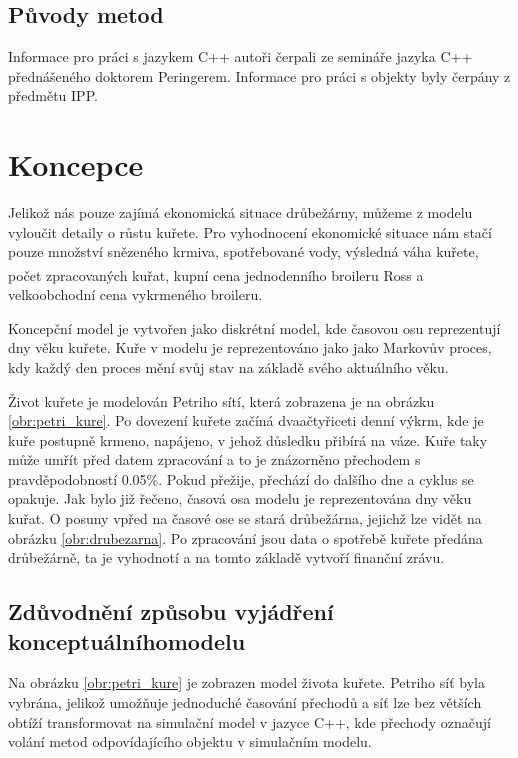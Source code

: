 \documentclass[a4paper,10pt]{article}
\begin{document}
\subsection{Původy metod}\label{puvod}
Informace pro práci s jazykem C++ autoři čerpali ze semináře jazyka C++\cite{cpp}
přednášeného doktorem Peringerem. Informace pro práci s objekty byly čerpány
z předmětu IPP\cite{ipp}.





\section{Koncepce}\label{koncepce}
Jelikož nás pouze zajímá ekonomická situace drůbežárny, můžeme z modelu vyloučit detaily
o růstu kuřete. Pro vyhodnocení ekonomické situace nám stačí pouze množství snězeného krmiva,
spotřebované vody, výsledná váha kuřete, počet zpracovaných kuřat, 
kupní cena jednodenního broileru Ross\textsuperscript\textregistered
a velkoobchodní cena vykrmeného broileru.
\par
Koncepční model\cite{concept_model} je vytvořen jako diskrétní model, kde časovou osu reprezentují dny věku kuřete.
Kuře v modelu je reprezentováno jako jako Markovův proces\cite{markovuv_proces},
kdy každý den proces mění svůj stav na základě svého aktuálního věku.
\par
Život kuřete je modelován Petriho sítí, která zobrazena je na obrázku \ref{obr:petri_kure}.
Po dovezení kuřete začíná dvaačtyřiceti denní výkrm, kde je kuře postupně krmeno, napájeno, v jehož důsledku
přibírá na váze. Kuře taky může umřít před datem zpracování a to je znázorněno přechodem\cite{prechod} s pravděpodobností 0.05\%.
Pokud přežije, přechází do dalšího dne a cyklus se opakuje. Jak bylo již řečeno, časová osa modelu je reprezentována dny
věku kuřat. O posuny vpřed na časové ose se stará drůbežárna, jejichž lze vidět na obrázku \ref{obr:drubezarna}. 
Po zpracování jsou data o spotřebě kuřete předána drůbežárně, ta je vyhodnotí a na tomto základě vytvoří finanční zrávu.

\subsection{Zdůvodnění způsobu vyjádření konceptuálního\newline modelu}
Na obrázku \ref{obr:petri_kure} je zobrazen model života kuřete. Petriho síť byla vybrána, jelikož umožňuje
jednoduché časování přechodů a síť lze bez větších obtíží transformovat na simulační model v jazyce C++, kde přechody
označují volání metod odpovídajícího objektu v simulačním modelu.
\end{document}
